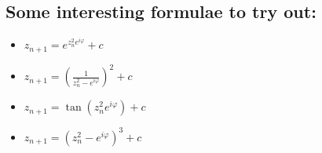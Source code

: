 \documentclass[12pt, a4paper]{article}
\begin{document}
\subsection*{Some interesting formulae to try out:}
\begin{itemize}
\item
$z_{n+1} = e^{z_n^2 e^{i\varphi}}+c$
\item
$z_{n+1} = \left(\frac{1}{z_n^2 - e^{i\varphi}}\right)^2 + c$
\item
$z_{n+1} = \tan(z_n^2 e^{i\varphi}) + c$
\item
$z_{n+1} = (z_n^2 - e^{i\varphi})^3 + c$
\end{itemize}
\end{document}
